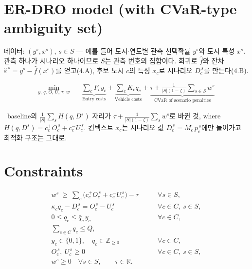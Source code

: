 \documentclass[10pt,a4paper]{article}
\newcommand{\circnum}[1]{\textcircled{\scriptsize #1}}
\newcommand{\note}{\textreferencemark\ }
\newcommand{\under}[2]{\underbrace{#1}_{\text{#2}}}
\begin{document}
\newpage
\section{ER-DRO model (with CVaR-type ambiguity set)}

데이터: $(y^s,x^s)$, $s\in S$ --- 예를 들어 도시$\cdot$연도별 관측 선택확률 $y^s$와 도시 특성 $x^s$. 관측 하나가 시나리오 하나이므로 $S$는 관측 번호의 집합이다.
회귀로 $\hat f$와 잔차 $\hat\varepsilon^{\,s}=y^s-\hat f(x^s)$를 얻고(4.A), 후보 도시 $c$의 특성 $x_c$로 시나리오 $D_c^{\,s}$를 만든다(4.B).

\[
\boxed{\begin{aligned}
\min_{y,\,q,\,O,\,U,\,\tau,\,w}\quad
&\under{\sum_{c} F_c y_c}{Entry costs}
+\under{\sum_{c} K_c q_c}{Vehicle costs}
+\under{\tau+\frac{1}{|S|(1-\zeta)}\sum_{s\in S} w^{s}}{CVaR of scenario penalties}
\end{aligned}}
\]

\note baseline의 $\frac{1}{|S|}\sum_s H(q,D^s)$ 자리가 $\tau+\frac{1}{|S|(1-\zeta)}\sum_s w^s$로 바뀐 것, where $H(q,D^s) = c^+_cO_c^{\,s}+c^-_cU_c^{\,s}$. 컨텍스트 $x_c$는 시나리오 값 $D_c^{\,s} = M_c\,p_c^{\,s}$에만 들어가고 최적화 구조는 그대로.

\section{Constraints}

\[
\boxed{\begin{aligned}
w^{s}\ \ge\ \sum_{c}\big(c^+_cO_c^{\,s}+c^-_cU_c^{\,s}\big)-\tau &\qquad\forall s\in S,\\
\kappa_cq_c-D_c^{\,s}=O_c^{\,s}-U_c^{\,s} &\qquad\forall c\in C,\ s\in S,\\
0\le q_c\le\bar q_c\,y_c &\qquad\forall c\in C,\\
\textstyle\sum_{c\in C} q_c\le Q, &\\
y_c\in\{0,1\},\quad q_c\in\mathbb Z_{\ge0} &\qquad\forall c\in C,\\
O_c^{\,s},\ U_c^{\,s}\ge0 &\qquad\forall c\in C,\ s\in S,\\
w^{s}\ge0 \quad\forall s\in S,\qquad \tau\in\mathbb R. &
\end{aligned}}
\]
\end{document}
